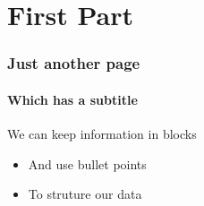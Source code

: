 




\begin{frame}
  \titlepage
\end{frame}

\section{First Part}
\begin{frame}
\frametitle{Just another page}
\framesubtitle{Which has a subtitle}

\begin{block}{We can keep information in blocks}
\begin{itemize}
\item And use bullet points
\item To struture our data
\end{itemize}
\end{block}
\end{frame}


